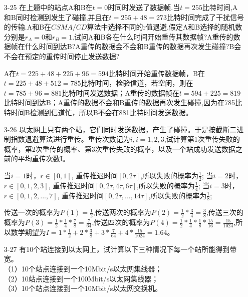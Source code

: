 \documentclass[a4paper,UTF8]{article}
\begin{document}
\begin{enumerate}
\item[3-25] 在上题中的站点A和B在$t=0$时同时发送了数据帧.当$t=255$比特时间,A和B同时检测到发生了碰撞,并且在$t=255+48=273$比特时间完成了干扰信号的传输.A和B在$CSMA/CD$算法中选择不同的r值退避.假定A和B选择的随机数分别是$r_A=0$和$r_B=1$.试问A和B各在什么时间开始重传其数据帧?A重传的数据帧在什么时间到达B?A重传的数据会不会和B重传的数据再次发生碰撞?B会不会在预定的重传时间停止发送数据?
\begin{solution}
    A在$t=225+48+225+96=594$比特时间开始重传数据帧，B在$t=225+48+512=785$比特时间，检验信道，若空闲，则在$t=785+96=881$比特时间发送数据；A重传的数据帧在$t=594+225=819$比特时间到达B；A重传的数据不会和B重传的数据再次发生碰撞,因为在785比特时间B检测到信道忙，所以B不会在881比特时间发送数据。
\end{solution}

\item[3-26] 以太网上只有两个站，它们同时发送数据，产生了碰撞。于是按截断二进制指数退避算法进行重传。重传次数记为$i,i=1,2,3$,试计算第1次重传失败的概率，第2次重传的概率、第3次重传失败的概率，以及一个站成功发送数据之前的平均重传次数I。 
\begin{solution}
    当$i=1$时，$r\in [0, 1]$, 重传推迟时间$[0, 2\tau]$,所以失败的概率为$\frac{1}{2}$;
    当$i=2$时，$r\in [0, 1, 2, 3]$, 重传推迟时间$[0, 2\tau, 4\tau, 6\tau]$,所以失败的概率为$\frac{1}{4}$;
    当$i=3$时，$r\in [0, 1, 2, ... , 7]$, 重传推迟时间$[0, 2\tau, ... , 14\tau]$,所以失败的概率为$\frac{1}{8}$;

    传送一次的概率为$P(1)=\frac{1}{2}$,传送两次的概率为$P(2)=\frac{1}{2}*\frac{3}{4}=\frac{3}{8}$,传送三次的概率为$P(3)=\frac{1}{2}*\frac{1}{4}*\frac{7}{8}=\frac{7}{64}$,传送四次的概率为$P(4)=\frac{1}{2}*\frac{1}{4}*\frac{1}{8}*\frac{15}{16}=\frac{15}{1024}$,所以数学期望为$I=1*\frac{1}{2}+2*\frac{3}{8}+3*\frac{7}{64}+4*\frac{15}{1024}=1.64$。
\end{solution}

\item[3-27] 有10个站连接到以太网上，试计算以下三种情况下每一个站所能得到带宽。\\
（1）10个站点连接到一个10Mbit/s以太网集线器；\\
（2）10站点连接到一个100Mbit/s以太网集线器；\\
（3）10个站点连接到一个10Mbit/s以太网交换机。


\end{enumerate}
\end{document}
